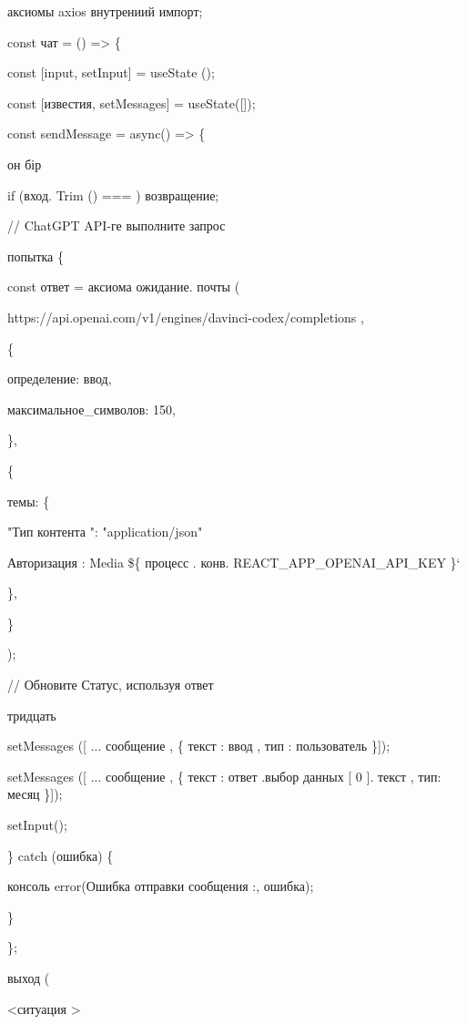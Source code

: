 аксиомы \textquotesingle axios\textquotesingle{} внутрениий импорт;

const чат = () =\textgreater{} \{

const {[}input, setInput{]} = useState
(\textquotesingle\textquotesingle);

const {[}известия, setMessages{]} = useState({[}{]});

const sendMessage = async() =\textgreater{} \{

он бір

if (вход. Trim () === \textquotesingle\textquotesingle) возвращение;

// ChatGPT API-ге выполните запрос

попытка \{

const ответ = аксиома ожидание. почты (

\textquotesingle https://api.openai.com/v1/engines/davinci-codex/completions\textquotesingle{}
,

\{

определение: ввод,

максимальное\_символов: 150,

\},

\{

темы: \{

"Тип контента ": "application/json"

\textquotesingle Авторизация\textquotesingle{} : \textquotesingle Media
\$\{ процесс . конв. REACT\_APP\_OPENAI\_API\_KEY \}`

\},

\}

);

// Обновите Статус, используя ответ

тридцать

setMessages ({[} ... сообщение , \{ текст : ввод , тип :
\textquotesingle пользователь\textquotesingle{} \}{]});

setMessages ({[} ... сообщение , \{ текст : ответ .выбор данных {[} 0
{]}. текст , тип: \textquotesingle месяц\textquotesingle{} \}{]});

setInput(\textquotesingle\textquotesingle);

\} catch (ошибка) \{

консоль error(\textquotesingle\textquotesingle Ошибка отправки сообщения
:\textquotesingle, ошибка);

\}

\};

выход (

\textless ситуация \textgreater{}

